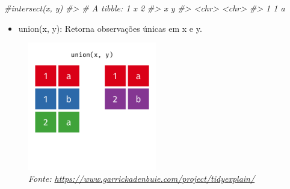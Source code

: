 \documentclass[
]{article}
\newenvironment{Shaded}{\begin{snugshade}}{\end{snugshade}}
\newcommand{\CommentTok}[1]{\textcolor[rgb]{0.56,0.35,0.01}{\textit{#1}}}
\providecommand{\tightlist}{%
  \setlength{\itemsep}{0pt}\setlength{\parskip}{0pt}}
\begin{document}
\begin{Shaded}
\begin{Highlighting}[]
\CommentTok{#intersect(x, y)}
\CommentTok{#> # A tibble: 1 x 2}
\CommentTok{#>   x     y    }
\CommentTok{#>   <chr> <chr>}
\CommentTok{#> 1 1     a}
\end{Highlighting}
\end{Shaded}

\begin{itemize}
\tightlist
\item
  union(x, y): Retorna observações únicas em x e y.
\end{itemize}

\begin{figure}
\centering
\includegraphics[width=0.5\textwidth,height=\textheight]{union.gif}
\caption{\emph{Fonte:
\url{https://www.garrickadenbuie.com/project/tidyexplain/}}}
\end{figure}
\end{document}
